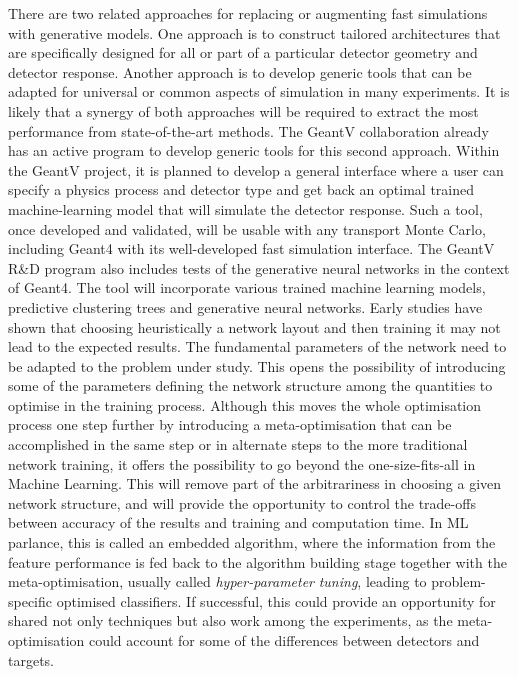 \documentclass[12pt,a4paper]{article}
\begin{document}
There are two related approaches for replacing or augmenting fast
simulations with generative models. One approach is to construct
tailored architectures that are specifically designed for all or part of
a particular detector geometry and detector response. Another approach
is to develop generic tools that can be adapted for universal or common
aspects of simulation in many experiments. It is likely that a synergy
of both approaches will be required to extract the most performance from
state-of-the-art methods. The GeantV collaboration already has an active
program to develop generic tools for this second approach. Within the
GeantV project, it is planned to develop a general interface where a
user can specify a physics process and detector type and get back an
optimal trained machine-learning model that will simulate the detector
response. Such a tool, once developed and validated, will be usable with
any transport Monte Carlo, including Geant4 with its well-developed fast
simulation interface. The GeantV R\&D program also includes tests of the
generative neural networks in the context of Geant4. The tool will
incorporate various trained machine learning models, predictive
clustering trees and generative neural networks. Early studies have
shown that choosing heuristically a network layout and then training it
may not lead to the expected results. The fundamental parameters of the
network need to be adapted to the problem under study. This opens the
possibility of introducing some of the parameters defining the network
structure among the quantities to optimise in the training process.
Although this moves the whole optimisation process one step further by
introducing a meta-optimisation that can be accomplished in the same
step or in alternate steps to the more traditional network training, it
offers the possibility to go beyond the one-size-fits-all in Machine
Learning. This will remove part of the arbitrariness in choosing a given
network structure, and will provide the opportunity to control the
trade-offs between accuracy of the results and training and computation
time. In ML parlance, this is called an embedded algorithm, where the
information from the feature performance is fed back to the algorithm
building stage together with the meta-optimisation, usually called
\emph{hyper-parameter} \emph{tuning}, leading to problem-specific
optimised classifiers. If successful, this could provide an opportunity
for shared not only techniques but also work among the experiments, as
the meta-optimisation could account for some of the differences between
detectors and targets.
\end{document}
